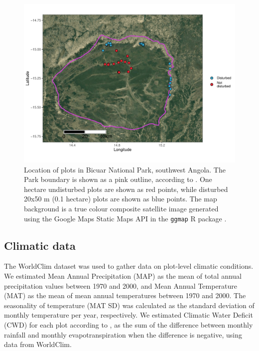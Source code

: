 \begin{refsection}
\begin{figure}
	\includegraphics[width=\textwidth]{img/bicuar_map}
	\caption[Location of plots within Bicuar National Park]{Location of plots in Bicuar National Park, southwest Angola. The Park boundary is shown as a pink outline, according to \citet{WDPA2019}. One hectare undisturbed plots are shown as red points, while disturbed 20x50 m (0.1 hectare) plots are shown as blue points. The map background is a true colour composite satellite image generated using the Google Maps Static Maps API in the \texttt{ggmap} R package \citep{ggmap}.}
	\label{bicuar:bicuar_map}
\end{figure}

\subsection{Climatic data}
\label{bicuar:ssec:climate}

The WorldClim dataset \citep{Fick2017} was used to gather data on plot-level climatic conditions. We estimated Mean Annual Precipitation (MAP) as the mean of total annual precipitation values between 1970 and 2000, and Mean Annual Temperature (MAT) as the mean of mean annual temperatures between 1970 and 2000. The seasonality of temperature (MAT SD) was calculated as the standard deviation of monthly temperature per year, respectively. We estimated Climatic Water Deficit (CWD) for each plot according to \citep{Chave2014}, as the sum of the difference between monthly rainfall and monthly evapotranspiration when the difference is negative, using data from WorldClim.


\end{refsection}
